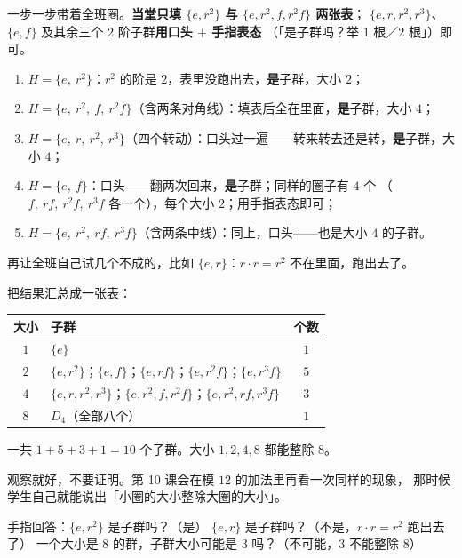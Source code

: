 \begin{caozuo}
  一步一步带着全班圈。\textbf{当堂只填 \(\{e,r^2\}\) 与 \(\{e,r^2,f,r^2f\}\) 两张表}；
  \(\{e,r,r^2,r^3\}\)、\(\{e,f\}\) 及其余三个 \(2\) 阶子群\textbf{用口头 \(+\) 手指表态}
  （「是子群吗？举 \(1\) 根／\(2\) 根」）即可。
  \begin{enumerate}
    \item \(H=\{e,\ r^2\}\)：\(r^2\) 的阶是 \(2\)，表里没跑出去，\textbf{是}子群，大小 \(2\)；
    \item \(H=\{e,\ r^2,\ f,\ r^2f\}\)（含两条对角线）：填表后全在里面，\textbf{是}子群，大小 \(4\)；
    \item \(H=\{e,\ r,\ r^2,\ r^3\}\)（四个转动）：口头过一遍——转来转去还是转，\textbf{是}子群，大小 \(4\)；
    \item \(H=\{e,\ f\}\)：口头——翻两次回来，\textbf{是}子群；同样的圈子有 \(4\) 个
      （\(f,\ rf,\ r^2f,\ r^3f\) 各一个），每个大小 \(2\)；用手指表态即可；
    \item \(H=\{e,\ r^2,\ rf,\ r^3f\}\)（含两条中线）：同上，口头——也是大小 \(4\) 的子群。
  \end{enumerate}
  再让全班自己试几个不成的，比如 \(\{e,r\}\)：\(r\cdot r=r^2\) 不在里面，跑出去了。
\end{caozuo}

把结果汇总成一张表：

\begin{center}
\begin{tabular}{@{}clc@{}}
  \toprule
  大小 & 子群 & 个数 \\
  \midrule
  \(1\) & \(\{e\}\) & \(1\) \\
  \(2\) & \(\{e,r^2\}\)；\(\{e,f\}\)；\(\{e,rf\}\)；\(\{e,r^2f\}\)；\(\{e,r^3f\}\) & \(5\) \\
  \(4\) & \(\{e,r,r^2,r^3\}\)；\(\{e,r^2,f,r^2f\}\)；\(\{e,r^2,rf,r^3f\}\) & \(3\) \\
  \(8\) & \(D_4\)（全部八个） & \(1\) \\
  \bottomrule
\end{tabular}
\end{center}

一共 \(1+5+3+1=10\) 个子群。大小 \(1,2,4,8\) 都能整除 \(8\)。

\begin{zhu}
  观察就好，不要证明。第 10 课会在模 \(12\) 的加法里再看一次同样的现象，
  那时候学生自己就能说出「小圈的大小整除大圈的大小」。
\end{zhu}

\begin{caozuo}
  手指回答：\(\{e,r^2\}\) 是子群吗？（是）
  \(\{e,r\}\) 是子群吗？（不是，\(r\cdot r=r^2\) 跑出去了）
  一个大小是 \(8\) 的群，子群大小可能是 \(3\) 吗？（不可能，\(3\) 不能整除 \(8\)）
\end{caozuo}

